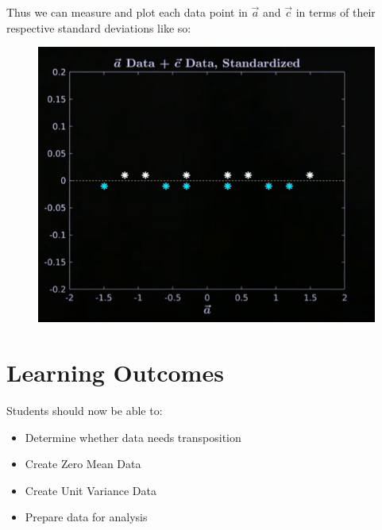 \documentclass[12pt]{book}
\begin{document}
Thus we can measure and plot each data point in $\vec a$ and  $\vec c$ in terms of their respective standard deviations like so:
 \begin{figure}[h]
        \centering
        \includegraphics[scale=0.5]{./figures/stdData}
\end{figure}
\section*{Learning Outcomes}
Students should now be able to:
\begin{itemize}
        \item Determine whether data needs transposition
        \item Create Zero Mean Data
        \item Create Unit Variance Data
        \item Prepare data for analysis
\end{itemize}
\end{document}
